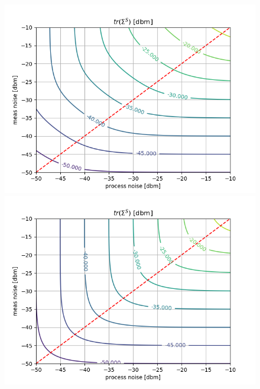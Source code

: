 \documentclass[oneside,12pt]{article}
\begin{document}
\begin{figure}[!tbp]
  \centering
  \begin{minipage}[b]{0.45\textwidth}
    \includegraphics[width=\textwidth]{./fig_1d_smoothing_f09}
  \end{minipage}
  \begin{minipage}[b]{0.45\textwidth}
    \includegraphics[width=\textwidth]{./fig_1d_smoothing_f01}
  \end{minipage}
  \vfill
    \begin{minipage}[b]{0.45\textwidth}

\end{minipage}
\end{figure}
\end{document}
